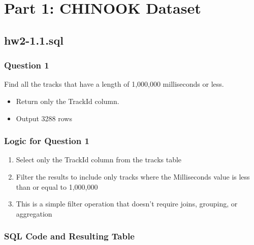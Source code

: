 \documentclass{article}
\begin{document}
\section*{Part 1: CHINOOK Dataset}

\subsection*{hw2-1.1.sql}

\subsubsection*{Question 1}

\parbox{\textwidth}{Find all the tracks that have a length of 1,000,000 milliseconds or less.}

\begin{itemize}
    \item Return only the TrackId column.
    \item Output 3288 rows
\end{itemize}

\subsubsection*{Logic for Question 1}
\begin{enumerate}
    \item \parbox{\textwidth}{Select only the TrackId column from the tracks table}
    \item \parbox{\textwidth}{Filter the results to include only tracks where the Milliseconds value is less than or equal to 1,000,000}
    \item \parbox{\textwidth}{This is a simple filter operation that doesn't require joins, grouping, or aggregation}
\end{enumerate}


\subsubsection*{SQL Code and Resulting Table}
\end{document}
